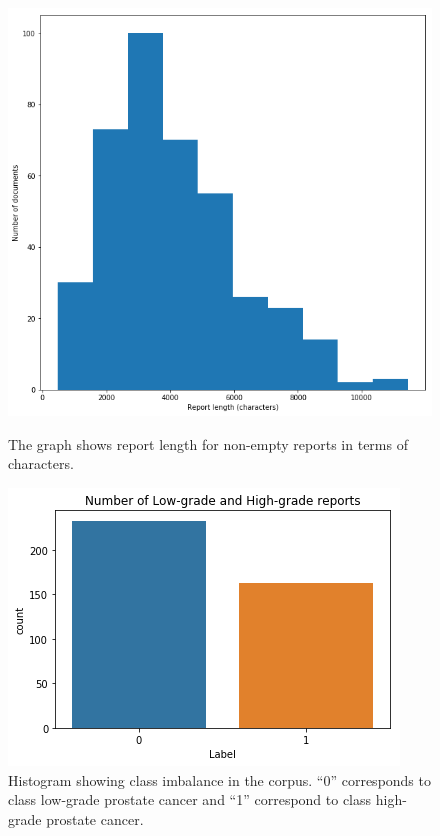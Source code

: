 \documentclass[runningheads]{llncs}
\begin{document}
\begin{figure}[h!]
  \centering
  \begin{minipage}[b]{0.4\textwidth}
    \includegraphics[width=\textwidth]{figures/varyingreportlengths.png}
    \caption{The graph shows report length for non-empty reports in terms of characters.}
  \end{minipage}
  \hfill
  \begin{minipage}[b]{0.4\textwidth}
    \includegraphics[width=\textwidth]{figures/high_low_imbalance.png}
    \caption{Histogram showing class imbalance in the corpus. ``0'' corresponds to class low-grade prostate cancer and ``1'' correspond to class high-grade prostate cancer.}
    \label{fig:datasetchar}
  \end{minipage}
\end{figure}
%
%
%
\end{document}
